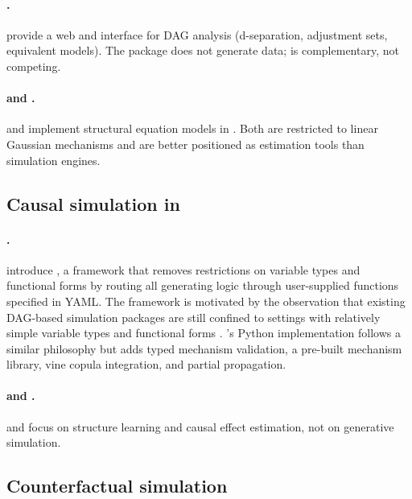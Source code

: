 \documentclass[article]{jss}
\begin{document}
\paragraph{.}
\citet{textor2016dagitty} provide a web and  interface for DAG
analysis (d-separation, adjustment sets, equivalent models). The package does not
generate data;  is complementary, not competing.

\paragraph{ and .}
\citet{rosseel2012lavaan} and \citet{neale2016openmx} implement structural equation
models in . Both are restricted to linear Gaussian mechanisms and are
better positioned as estimation tools than simulation engines.

\subsection{Causal simulation in }

\paragraph{.}
\citet{alhajj2023dagsim} introduce , a  framework
that removes restrictions on variable types and functional forms by routing all
generating logic through user-supplied functions specified in YAML. The framework
is motivated by the observation that existing DAG-based simulation packages are
still confined to settings with relatively simple variable types and functional
forms \citep{alhajj2023dagsim}. 's Python implementation follows
a similar philosophy but adds typed mechanism validation, a pre-built mechanism
library, vine copula integration, and partial propagation.

\paragraph{ and .}
\citet{beaumont2021causalnex} and \citet{sharma2020dowhy} focus on structure
learning and causal effect estimation, not on generative simulation.

\subsection{Counterfactual simulation}
\end{document}
